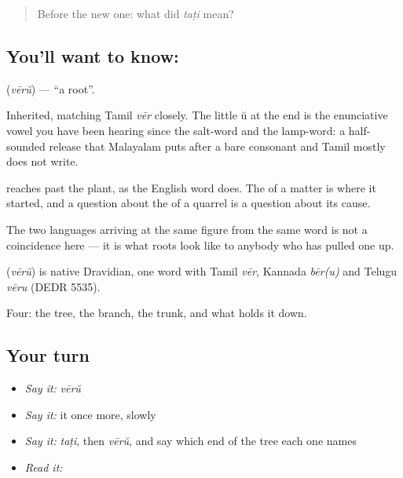 \label{lesson:ML-C54-root}



\begin{quote}
Before the new one: what did \emph{taṭi} mean?
\end{quote}

\subsection*{You'll want to know: }
\textbf{} (\emph{vērŭ}) — \textquotedblleft{}a root\textquotedblright{}.

Inherited, matching Tamil \emph{vēr} closely. The little ŭ at the end is the enunciative vowel you have been hearing since the salt-word and the lamp-word: a half-sounded release that Malayalam puts after a bare consonant and Tamil mostly does not write.

 reaches past the plant, as the English word does. The  of a matter is where it started, and a question about the  of a quarrel is a question about its cause.

The two languages arriving at the same figure from the same word is not a coincidence here — it is what roots look like to anybody who has pulled one up.

\begin{cousinweb}
\textbf{} (\emph{vērŭ}) is native Dravidian, one word with Tamil \emph{vēr}, Kannada \emph{bēr(u)} and Telugu \emph{vēru} (DEDR 5535).
\end{cousinweb}

\begin{grammarlens}[title={What you've built}]
Four: the tree, the branch, the trunk, and what holds it down.
\end{grammarlens}

\subsection*{Your turn}
\begin{itemize}
\raggedright
  \item \emph{Say it:} \emph{vērŭ}
  \item \emph{Say it:} it once more, slowly
  \item \emph{Say it:} \emph{taṭi}, then \emph{vērŭ}, and say which end of the tree each one names
  \item \emph{Read it:} \textbf{}
\end{itemize}

